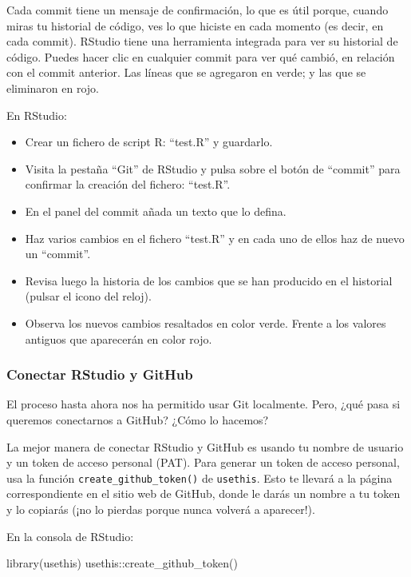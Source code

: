 \documentclass[
  letterpaper,
  DIV=11,
  numbers=noendperiod]{scrreprt}
\newenvironment{Shaded}{\begin{snugshade}}{\end{snugshade}}
\newcommand{\FunctionTok}[1]{\textcolor[rgb]{0.28,0.35,0.67}{#1}}
\newcommand{\NormalTok}[1]{\textcolor[rgb]{0.00,0.23,0.31}{#1}}
\newcommand{\SpecialCharTok}[1]{\textcolor[rgb]{0.37,0.37,0.37}{#1}}
\begin{document}
Cada commit tiene un mensaje de confirmación, lo que es útil porque,
cuando miras tu historial de código, ves lo que hiciste en cada momento
(es decir, en cada commit). RStudio tiene una herramienta integrada para
ver su historial de código. Puedes hacer clic en cualquier commit para
ver qué cambió, en relación con el commit anterior. Las líneas que se
agregaron en verde; y las que se eliminaron en rojo.

En RStudio:

\begin{itemize}
\item
  Crear un fichero de script R: ``test.R'' y guardarlo.
\item
  Visita la pestaña ``Git'' de RStudio y pulsa sobre el botón de
  ``commit'' para confirmar la creación del fichero: ``test.R''.
\item
  En el panel del commit añada un texto que lo defina.
\item
  Haz varios cambios en el fichero ``test.R'' y en cada uno de ellos haz
  de nuevo un ``commit''.
\item
  Revisa luego la historia de los cambios que se han producido en el
  historial (pulsar el icono del reloj).
\item
  Observa los nuevos cambios resaltados en color verde. Frente a los
  valores antiguos que aparecerán en color rojo.
\end{itemize}

\hypertarget{conectar-rstudio-y-github}{%
\subsubsection{Conectar RStudio y
GitHub}\label{conectar-rstudio-y-github}}

El proceso hasta ahora nos ha permitido usar Git localmente. Pero, ¿qué
pasa si queremos conectarnos a GitHub? ¿Cómo lo hacemos?

La mejor manera de conectar RStudio y GitHub es usando tu nombre de
usuario y un token de acceso personal (PAT). Para generar un token de
acceso personal, usa la función \texttt{create\_github\_token()} de
\texttt{usethis}. Esto te llevará a la página correspondiente en el
sitio web de GitHub, donde le darás un nombre a tu token y lo copiarás
(¡no lo pierdas porque nunca volverá a aparecer!).

En la consola de RStudio:

\begin{Shaded}
\begin{Highlighting}[]
\FunctionTok{library}\NormalTok{(usethis)}
\NormalTok{usethis}\SpecialCharTok{::}\FunctionTok{create\_github\_token}\NormalTok{()}
\end{Highlighting}
\end{Shaded}
\end{document}
